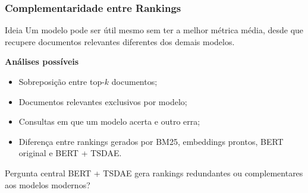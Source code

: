 \documentclass[aspectratio=169]{beamer}
\begin{document}
\begin{frame}
\frametitle{Complementaridade entre Rankings}

\begin{block}{Ideia}
Um modelo pode ser útil mesmo sem ter a melhor métrica média, desde que recupere documentos relevantes diferentes dos demais modelos.
\end{block}

\vspace{0.25cm}

\textbf{Análises possíveis}

\begin{itemize}
  \item Sobreposição entre top-$k$ documentos;
  \item Documentos relevantes exclusivos por modelo;
  \item Consultas em que um modelo acerta e outro erra;
  \item Diferença entre rankings gerados por BM25, embeddings prontos, BERT original e BERT + TSDAE.
\end{itemize}

\vspace{0.25cm}

\begin{alertblock}{Pergunta central}
BERT + TSDAE gera rankings redundantes ou complementares aos modelos modernos?
\end{alertblock}

\end{frame}
\end{document}
